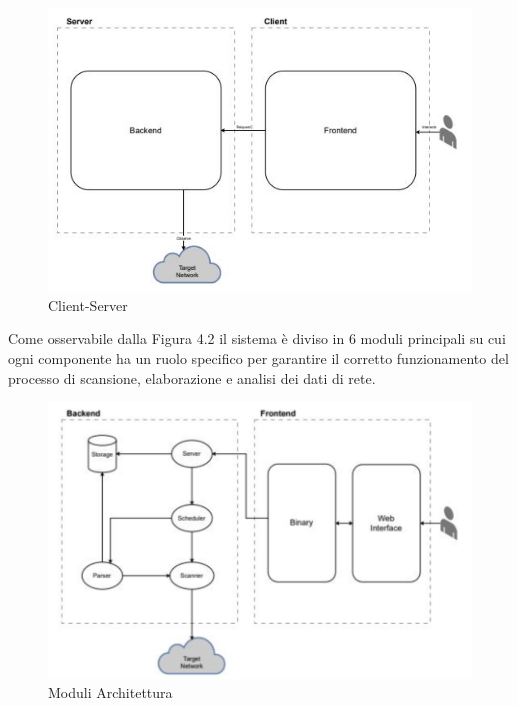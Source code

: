 \documentclass[target=bach,aauheader=,style=]{thud}
\begin{document}
\begin{figure}[t]
  \includegraphics[width=\columnwidth]{client_server}
  \centering
  \caption{Client-Server}
  \label{client-server}
\end{figure}

\FloatBarrier

Come osservabile dalla Figura 4.2 il sistema è diviso in 6 moduli principali su cui ogni componente ha un ruolo specifico per garantire il corretto funzionamento del processo di scansione, elaborazione e analisi dei dati di rete. 


\begin{figure}[t]
  \includegraphics[width=\columnwidth]{moduli}
  \centering
  \caption{Moduli Architettura}
  \label{moduli}
\end{figure}

\FloatBarrier
\end{document}
